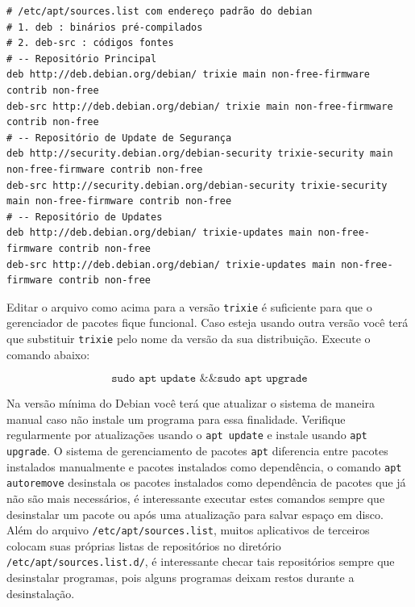 \documentclass[12pt,a4paper]{article}
\begin{document}
\begin{lstlisting}
# /etc/apt/sources.list com endereço padrão do debian 
# 1. deb : binários pré-compilados 
# 2. deb-src : códigos fontes
# -- Repositório Principal
deb http://deb.debian.org/debian/ trixie main non-free-firmware contrib non-free
deb-src http://deb.debian.org/debian/ trixie main non-free-firmware contrib non-free
# -- Repositório de Update de Segurança
deb http://security.debian.org/debian-security trixie-security main non-free-firmware contrib non-free
deb-src http://security.debian.org/debian-security trixie-security main non-free-firmware contrib non-free
# -- Repositório de Updates
deb http://deb.debian.org/debian/ trixie-updates main non-free-firmware contrib non-free
deb-src http://deb.debian.org/debian/ trixie-updates main non-free-firmware contrib non-free
\end{lstlisting}

\vspace{\baselineskip}

Editar o arquivo como acima para a versão \texttt{trixie} é suficiente para que o gerenciador de pacotes fique funcional. Caso esteja usando outra versão você terá que substituir \texttt{trixie} pelo nome da versão da sua distribuição. Execute o comando abaixo:

$$ \texttt{sudo apt update \&\& sudo apt upgrade} $$

\vspace{\baselineskip}

Na versão mínima do Debian você terá que atualizar o sistema de maneira manual caso não instale um programa para essa finalidade. Verifique regularmente por atualizações usando o \texttt{apt update} e instale usando \texttt{apt upgrade}. O sistema de gerenciamento de pacotes \texttt{apt} diferencia entre pacotes instalados manualmente e pacotes instalados como dependência, o comando \texttt{apt autoremove} desinstala os pacotes instalados como dependência de pacotes que já não são mais necessários, é interessante executar estes comandos sempre que desinstalar um pacote ou após uma atualização para salvar espaço em disco. \\

Além do arquivo \texttt{/etc/apt/sources.list}, muitos aplicativos de terceiros colocam suas próprias listas de repositórios no diretório \texttt{/etc/apt/sources.list.d/}, é interessante checar tais repositórios sempre que desinstalar programas, pois alguns programas deixam restos durante a desinstalação. \\
\end{document}
